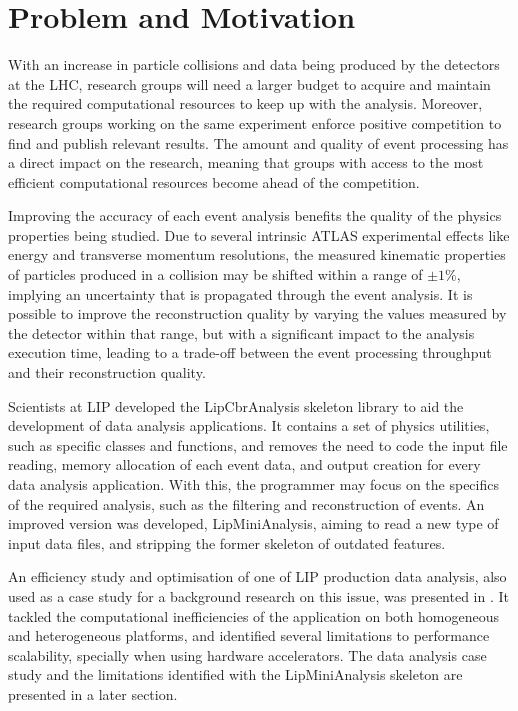 \section{Problem and Motivation}
\label{motivation}

With an increase in particle collisions and data being produced by the detectors at the LHC, research groups will need a larger budget to acquire and maintain the required computational resources to keep up with the analysis. Moreover, research groups working on the same experiment enforce positive competition to find and publish relevant results. The amount and quality of event processing has a direct impact on the research, meaning that groups with access to the most efficient computational resources become ahead of the competition.

Improving the accuracy of each event analysis benefits the quality of the physics properties being studied. Due to several intrinsic ATLAS experimental effects like energy and transverse momentum resolutions, the measured kinematic properties of particles produced in a collision may be shifted within a range of $\pm1\%$, implying an uncertainty that is propagated through the event analysis. It is possible to improve the reconstruction quality by varying the values measured by the detector within that range, but with a significant impact to the analysis execution time, leading to a trade-off between the event processing throughput and their reconstruction quality.

Scientists at LIP developed the LipCbrAnalysis skeleton library to aid the development of data analysis applications. It contains a set of physics utilities, such as specific classes and functions, and removes the need to code the input file reading, memory allocation of each event data, and output creation for every data analysis application. With this, the programmer may focus on the specifics of the required analysis, such as the filtering and reconstruction of events. An improved version was developed, LipMiniAnalysis, aiming to read a new type of input data files, and stripping the former skeleton of outdated features.

An efficiency study and optimisation of one of LIP production data analysis, also used as a case study for a background research on this issue, was presented in \cite{Msc:AMP,paperAMP}. It tackled the computational inefficiencies of the application on both homogeneous and heterogeneous platforms, and identified several limitations to performance scalability, specially when using hardware accelerators. The data analysis case study and the limitations identified with the LipMiniAnalysis skeleton are presented in a later section.

